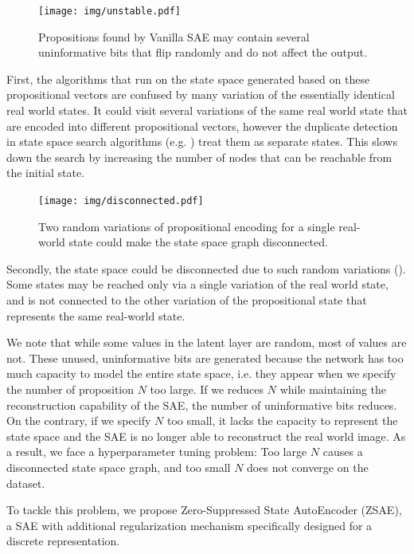 \begin{figure}[htb]
 \centering
 \texttt{[image: img/unstable.pdf]}
 \caption{Propositions found by Vanilla SAE may contain several uninformative bits
 that flip randomly and do not affect the output.}
 \label{unstable}
\end{figure}

First, the algorithms that run on the state space generated based on these propositional vectors
are confused by many variation of the essentially identical real world states.
It could visit several variations of the same real world state that are encoded into different propositional vectors,
however the duplicate detection in state space search algorithms (e.g. \astar) treat them as separate states.
This slows down the search by increasing the number of nodes that can be reachable from the initial state.

\begin{figure}[htb]
 \centering
 \texttt{[image: img/disconnected.pdf]}
 \caption{Two random variations of propositional encoding for a single real-world state could make the state space graph disconnected.}
 \label{disconnected}
\end{figure}

Secondly, the state space could be disconnected due to such random variations ().
Some states may be reached only via a single variation of the real world state, and is not connected to the
other variation of the propositional state that represents the same real-world state.

We note that while some values in the latent layer are random, most of values are not.
These unused, uninformative bits are generated because the network has too much capacity to 
model the entire state space, i.e. they appear when we specify the number of proposition $N$ too large.
If we reduces $N$ while maintaining the reconstruction capability of the SAE, the number of uninformative bits
reduces.
On the contrary, if we specify $N$ too small, it lacks the capacity to represent the state space
and the SAE is no longer able to reconstruct the
real world image.
As a result, we face a hyperparameter tuning problem: Too large $N$ causes a disconnected state space graph,
and too small $N$ does not converge on the dataset.

To tackle this problem, we propose Zero-Suppressed State AutoEncoder (ZSAE),
a SAE with additional regularization mechanism specifically designed for a discrete representation.

